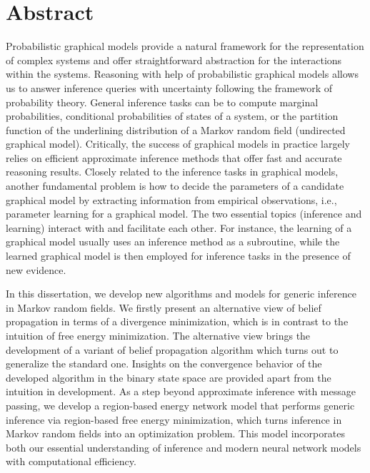 \chapter{Abstract}
Probabilistic graphical models provide a natural framework for the representation of complex systems and offer straightforward abstraction for the interactions within the systems. Reasoning with help of probabilistic graphical models allows us to answer inference queries with uncertainty following the framework of probability theory. General inference tasks can be to compute marginal probabilities, conditional probabilities of states of a system, or the partition function of the underlining distribution of a Markov random field (undirected graphical model). Critically, the success of graphical models in practice largely relies on efficient approximate inference methods that offer fast and accurate reasoning results. Closely related to the inference tasks in graphical models, another fundamental problem is how to decide the parameters of a candidate graphical model by extracting information from empirical observations, i.e., parameter learning for a graphical model. The two essential topics (inference and learning) interact with and facilitate each other. For instance, the learning of a graphical model usually uses an inference method as a subroutine, while the learned graphical model is then employed for inference tasks in the presence of new evidence.

In this dissertation, we develop new algorithms and models for generic inference in Markov random fields. We firstly present an alternative view of belief propagation in terms of a divergence minimization, which is in contrast to the intuition of free energy minimization. The alternative view brings the development of a variant of belief propagation algorithm which turns out to generalize the standard one. Insights on the convergence behavior of the developed algorithm in the binary state space are provided apart from the intuition in development. As a step beyond approximate inference with message passing, we develop a region-based energy network model that performs generic inference via region-based free energy minimization, which turns inference in Markov random fields into an optimization problem. This model incorporates both our essential understanding of inference and modern neural network models with computational efficiency.

